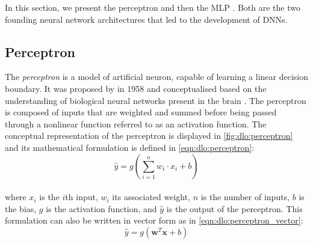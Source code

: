 In this section, we present the perceptron \cite{rosenblatt1958perceptron} and
then the \acl{MLP} \cite{rosenblatt1961principles,rumelhart1986learning}. Both
are the two founding neural network architectures that led to the development of
\aclp{DNN}.

\subsection{Perceptron}\label{sec:dlo:perceptron}

The \emph{perceptron} is a model of artificial neuron, capable of learning a
linear decision boundary. It was proposed by
\citeauthor{rosenblatt1958perceptron} in 1958 \cite{rosenblatt1958perceptron}
and conceptualised based on the understanding of biological neural networks
present in the brain \cite{mcculloch1943logical,hebb2005organization}. The
perceptron is composed of inputs that are weighted and summed before being
passed through a nonlinear function referred to as an activation function. The
conceptual representation of the perceptron is displayed in
\cref{fig:dlo:perceptron} and its mathematical formulation is defined in
\cref{eqn:dlo:perceptron}: \\

\begin{equation}
  \label{eqn:dlo:perceptron}
\hat{y} = g(\sum_{i=1}^{n} w_i \cdot x_i + b)
\end{equation} \\



\noindent where $x_i$ is the $i$th input, $w_i$ its associated weight, $n$ is
the number of inputs, $b$ is the bias, $g$ is the activation function, and
$\hat{y}$ is the output of the perceptron. This formulation can also be written
in vector form as in \cref{eqn:dlo:perceptron_vector}: \\

\begin{equation}
  \label{eqn:dlo:perceptron_vector}
  \hat{y} = g(\mathbf{w}^T \mathbf{x} + b)
\end{equation}\\

